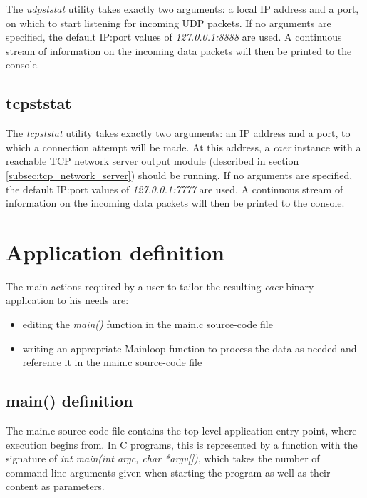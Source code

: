 \documentclass[a4paper,12pt]{report}
\begin{document}
The \emph{udpststat} utility takes exactly two arguments: a local IP address and a port, on which to start listening for incoming UDP packets.
If no arguments are specified, the default IP:port values of \emph{127.0.0.1:8888} are used.
A continuous stream of information on the incoming data packets will then be printed to the console.

\subsection{tcpststat} \label{subsec:tcpststat}

The \emph{tcpststat} utility takes exactly two arguments: an IP address and a port, to which a connection attempt will be made. At this address, a \emph{caer} instance with a reachable TCP network server output module (described in section \ref{subsec:tcp_network_server}) should be running.
If no arguments are specified, the default IP:port values of \emph{127.0.0.1:7777} are used.
A continuous stream of information on the incoming data packets will then be printed to the console.

\section{Application definition} \label{sec:application_definition}

The main actions required by a user to tailor the resulting \emph{caer} binary application to his needs are:
\begin{itemize}
\item editing the \emph{main()} function in the main.c source-code file
\item writing an appropriate Mainloop function to process the data as needed and reference it in the main.c source-code file
\end{itemize}

\subsection{main() definition} \label{subsec:main_definition}

The main.c source-code file contains the top-level application entry point, where execution begins from.
In C programs, this is represented by a function with the signature of \emph{int main(int argc, char *argv[])}, which takes the number of command-line arguments given when starting the program as well as their content as parameters.
\end{document}
